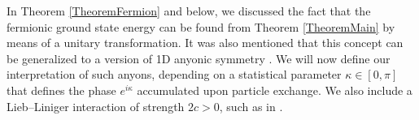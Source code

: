 \documentclass[a4paper,11pt]{article}
\newcommand{\dom}[1]{\mathcal D\left(#1\right)}
\newcommand{\ie}{\emph{i.e.} }
\numberwithin{equation}{section}
\begin{document}
	
	In Theorem \ref{TheoremFermion} and below, we discussed the fact that the fermionic ground state energy can be found from Theorem \ref{TheoremMain} by means of a unitary transformation. It was also mentioned that this concept can be generalized to a version of 1D anyonic symmetry \cite{leinaas1977theory,bonkhoff2021bosonic,posske2017second}. We will now define our interpretation of such anyons, depending on a statistical parameter $\kappa\in[0,\pi]$ that defines the phase $e^{i\kappa}$ accumulated upon particle exchange. We also include a Lieb--Liniger interaction of strength $2c>0$, such as in \cite{kundu1999exact,hao2008ground,batchelor2006one}.
	
\end{document}
